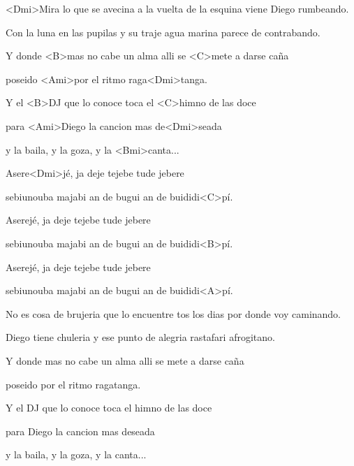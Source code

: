 

\zs
<Dmi>Mira lo que se avecina a la vuelta de la esquina viene Diego rumbeando.

Con la luna en las pupilas y su traje agua marina parece de contrabando.


Y donde <B>mas no cabe un alma alli se <C>mete a darse caña

poseido <Ami>por el ritmo raga<Dmi>tanga.

Y el <B>DJ que lo conoce toca el <C>himno de las doce

para <Ami>Diego la cancion mas de<Dmi>seada

y la baila, y la goza, y la <Bmi>canta...
\ks

\zr
Asere<Dmi>jé, ja deje tejebe tude jebere

sebiunouba majabi an de bugui an de buididi<C>pí.

Aserejé, ja deje tejebe tude jebere

sebiunouba majabi an de bugui an de buididi<B>pí.

Aserejé, ja deje tejebe tude jebere

sebiunouba majabi an de bugui an de buididi<A>pí.
\kr

\zs
No es cosa de brujeria
que lo encuentre tos los dias
por donde voy caminando.

Diego tiene chuleria
y ese punto de alegria
rastafari afrogitano.

Y donde mas no cabe un alma alli se mete a darse caña

poseido por el ritmo ragatanga.

Y el DJ que lo conoce toca el himno de las doce

para Diego la cancion mas deseada

y la baila, y la goza, y la canta...
\ks

\zr
\kr

\kp


